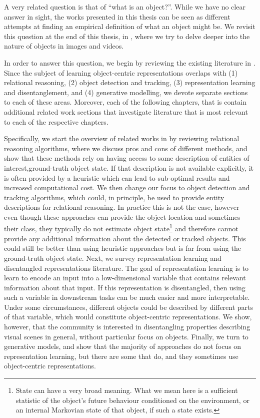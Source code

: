     A very related question is that of ``what is an object?''.
    While we have no clear answer in sight, the works presented in this thesis can be seen as different attempts at finding an empirical definition of what an object might be.
    We revisit this question at the end of this thesis, in , where we try to delve deeper into the nature of objects in images and videos.
 	
 	In order to answer this question, we begin by reviewing the existing literature in . 
 	Since the subject of learning object-centric representations overlaps with
 		(1) relational reasoning,
 		(2) object detection and tracking,
 		(3) representation learning and disentanglement, and
 		(4) generative modelling, we devote separate sections to each of these areas. 
	Moreover, each of the following chapters, that is  contain additional related work sections that investigate literature that is most relevant to each of the respective chapters.
 	
 	Specifically, we start the overview of related works in  by reviewing relational reasoning algorithms, where we discuss pros and cons of different methods, and show that these methods rely on having access to some description of entities of interest,\eg ground-truth object state.
 	If that description is not available explicitly, it is often provided by a heuristic which can lead to sub-optimal results and increased computational cost.
 	We then change our focus to object detection and tracking algorithms, which could, in principle, be used to provide entity descriptions for relational reasoning. In practice this is not the case, however---even though these approaches can provide the object location and sometimes their class, they typically do not estimate object state\footnote{State can have a very broad meaning. What we mean here is a sufficient statistic of the object's future behaviour conditioned on the environment, or an internal Markovian state of that object, if such a state exists.} and therefore cannot provide any additional information about the detected or tracked objects.
 	This could still be better than using heuristic approaches but is far from using the ground-truth object state.
 	Next, we survey representation learning and disentangled representations literature.
 	The goal of representation learning is to learn to encode an input into a low-dimensional variable that contains relevant information about that input.
 	If this representation is disentangled, then using such a variable in downstream tasks can be much easier and more interpretable.
 	Under some circumstances, different objects could be described by different parts of that variable, which would constitute object-centric representations.
 	We show, however, that the community is interested in disentangling properties describing visual scenes in general, without particular focus on objects.
 	Finally, we turn to generative models, and show that the majority of approaches do not focus on representation learning, but there are some that do, and they sometimes use object-centric representations.
 	 

